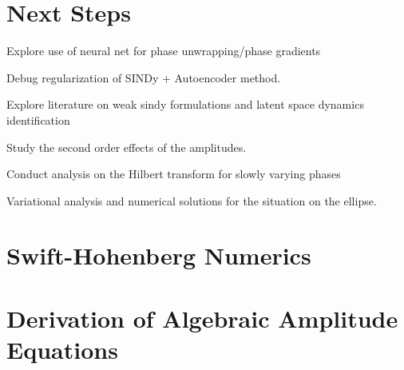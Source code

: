 \documentclass[12pt]{article}
\numberwithin{equation}{section}
\begin{document}




\section{Next Steps}
\par Explore use of neural net for phase unwrapping/phase gradients
\par Debug regularization of SINDy + Autoencoder method. 
\par Explore literature on weak sindy formulations and latent space dynamics identification
\par Study the second order effects of the amplitudes.
\par Conduct analysis on the Hilbert transform for slowly varying phases
\par Variational analysis and numerical solutions for the situation on the ellipse. 


\nocite{*}


\appendix
\section{Swift-Hohenberg Numerics}
\section{Derivation of Algebraic Amplitude Equations}
\end{document}
